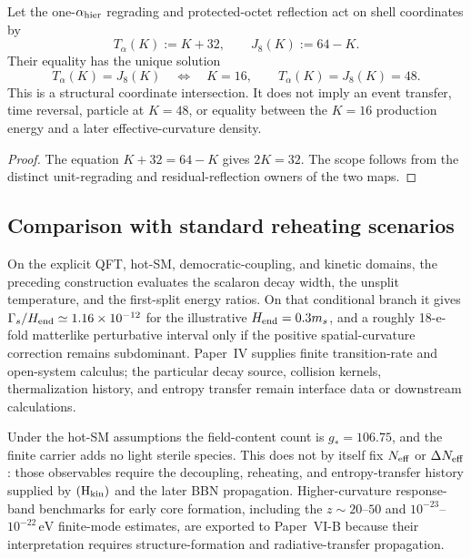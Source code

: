 \documentclass[12pt,a4paper]{article}
\begin{document}
\begin{corollary}[Unique \(K=16\) / \(K=48\) coordinate intersection]
\label{p8:cor:k16-k48-coordinate-intersection}
Let the one-\(\alpha_{\rm hier}\) regrading and protected-octet reflection act
on shell coordinates by
\begin{equation}
 T_\alpha(K):=K+32,
 \qquad
 J_8(K):=64-K.
\end{equation}
Their equality has the unique solution
\begin{equation}
 \label{p8:eq:k16-k48-coordinate-intersection}
 T_\alpha(K)=J_8(K)
 \quad\Longleftrightarrow\quad
 \boxed{K=16,\qquad T_\alpha(K)=J_8(K)=48.}
\end{equation}
This is a structural coordinate intersection.  It does not imply an event
transfer, time reversal, particle at \(K=48\), or equality between the
\(K=16\) production energy and a later effective-curvature density.
\end{corollary}

\begin{proof}
The equation \(K+32=64-K\) gives \(2K=32\).  The scope follows from the
distinct unit-regrading and residual-reflection owners of the two maps.
\end{proof}

\subsection{Comparison with standard reheating scenarios}
\label{p8:sec:reheating-differences}
On the explicit QFT, hot-SM, democratic-coupling, and kinetic domains, the
preceding construction evaluates the scalaron decay width, the unsplit
temperature, and the first-split energy ratios.  On that conditional branch it
gives \(\Gamma_s/H_{\rm end}\simeq1.16\times10^{-12}\) for the illustrative \(H_{\rm end}=0.3m_s\), and a roughly 18-e-fold matterlike perturbative interval only if the positive spatial-curvature correction remains subdominant.  Paper~IV supplies finite transition-rate and
open-system calculus; the particular decay source, collision kernels,
thermalization history, and entropy transfer remain interface data or
downstream calculations.

Under the hot-SM assumptions the field-content count is \(g_*=106.75\), and
the finite carrier adds no light sterile species.  This does not by itself fix
\(N_{\rm eff}\) or \(\Delta N_{\rm eff}\): those observables require the
decoupling, reheating, and entropy-transfer history supplied by
\((\mathrm H_{\rm kin})\) and the later BBN propagation.  Higher-curvature
response-band benchmarks for early core formation, including the
$z\sim20$--$50$ and $10^{-23}$--$10^{-22}\,\mathrm{eV}$ finite-mode
estimates, are exported to Paper~VI-B because their interpretation requires
structure-formation and radiative-transfer propagation.
\end{document}
